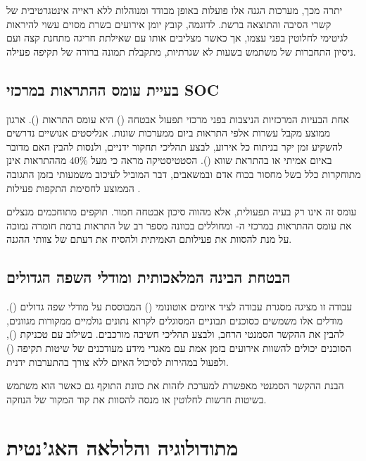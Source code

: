 \documentclass[11pt,a4paper]{article}
\begin{document}
יתרה מכך, מערכות הגנה אלו פועלות באופן מבודד ומנוהלות ללא ראייה אינטגרטיבית של קשרי הסיבה והתוצאה ברשת. לדוגמה, קובץ יומן אירועים בשרת מסוים עשוי להיראות לגיטימי לחלוטין בפני עצמו, אך כאשר מצליבים אותו עם שאילתת  חריגה מתחנת קצה ועם ניסיון התחברות של משתמש בשעות לא שגרתיות, מתקבלת תמונה ברורה של תקיפה פעילה.

\subsection{בעיית עומס ההתראות במרכזי SOC}
אחת הבעיות המרכזיות הניצבות בפני מרכזי תפעול אבטחה () היא עומס התראות (). ארגון ממוצע מקבל עשרות אלפי התראות ביום ממערכות שונות. אנליסטים אנושיים נדרשים להשקיע זמן יקר בניתוח כל אירוע, לבצע תהליכי תחקור ידניים, ולנסות להבין האם מדובר באיום אמיתי או בהתראת שווא (). הסטטיסטיקה מראה כי מעל $40\%$ מההתראות אינן מתוחקרות כלל בשל מחסור בכוח אדם ובמשאבים, דבר המוביל לעיכוב משמעותי בזמן התגובה הממוצע לחסימת התקפות פעילות \cite{Verizon2025}.

עומס זה אינו רק בעיה תפעולית, אלא מהווה סיכון אבטחה חמור. תוקפים מתוחכמים מנצלים את עומס ההתראות במרכזי ה- ומחוללים בכוונה מספר רב של התראות ברמת חומרה נמוכה על מנת להסוות את פעילותם האמיתית ולהסיח את דעתם של צוותי ההגנה.

\subsection{הבטחת הבינה המלאכותית ומודלי השפה הגדולים}
עבודה זו מציגה מסגרת עבודה לציד איומים אוטונומי () המבוססת על מודלי שפה גדולים (). מודלים אלו משמשים כסוכנים תבוניים המסוגלים לקרוא נתונים גולמיים ממקורות מגוונים, להבין את ההקשר הסמנטי הרחב, ולבצע תהליכי חשיבה מורכבים. בשילוב עם טכניקת  (), הסוכנים יכולים להשוות אירועים בזמן אמת עם מאגרי מידע מעודכנים של שיטות תקיפה () ולפעול במהירות לסיכול האיום ללא צורך בהתערבות ידנית.

הבנת ההקשר הסמנטי מאפשרת למערכת לזהות את כוונת התוקף גם כאשר הוא משתמש בשיטות חדשות לחלוטין או מנסה להסוות את קוד המקור של הנוזקה.

\section{מתודולוגיה והלולאה האג'נטית}
\end{document}
